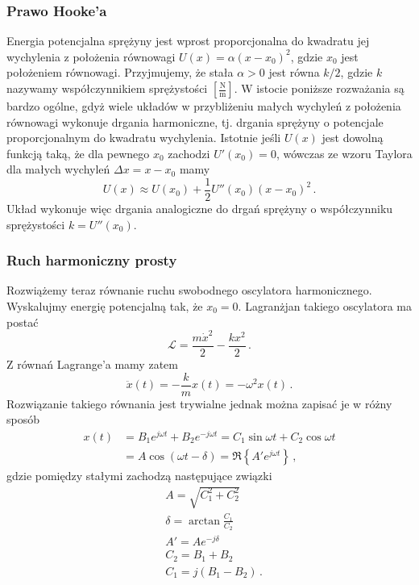 \documentclass[../main.tex]{subfiles}
\begin{document}
    \subsubsection{Prawo Hooke'a}
    Energia potencjalna sprężyny jest wprost proporcjonalna do kwadratu jej wychylenia z położenia
    równowagi \(U(x)=\alpha(x-x_0)^2\), gdzie \(x_0\) jest położeniem równowagi. Przyjmujemy, że
    stała \(\alpha>0\) jest równa \(k/2\), gdzie \(k\) nazywamy współczynnikiem sprężystości
    \([\frac{\text{N}}{\text{m}}]\). W istocie poniższe rozważania są bardzo ogólne, gdyż wiele
    układów w przybliżeniu małych wychyleń z położenia równowagi wykonuje drgania harmoniczne, tj.
    drgania sprężyny o potencjale proporcjonalnym do kwadratu wychylenia. Istotnie jeśli \(U(x)\)
    jest dowolną funkcją taką, że dla pewnego \(x_0\) zachodzi \(U'(x_0)=0\), wówczas ze wzoru
    Taylora dla małych wychyleń \(\Delta x=x-x_0\) mamy 
    \begin{equation*}
        U(x)\approx U(x_0)+\frac{1}{2}U''(x_0)(x-x_0)^2\,.
    \end{equation*}
    Układ wykonuje więc drgania analogiczne do drgań sprężyny o współczynniku sprężystości
    \(k=U''(x_0)\).
    \subsubsection{Ruch harmoniczny prosty}
    Rozwiążemy teraz równanie ruchu swobodnego oscylatora harmonicznego. Wyskalujmy energię
    potencjalną tak, że \(x_0=0\). Lagranżjan takiego oscylatora ma postać
    \begin{equation*}
        \mathcal{L}=\frac{m\dot{x}^2}{2}-\frac{kx^2}{2}\,.
    \end{equation*}
    Z równań Lagrange'a mamy zatem
    \begin{equation*}
        \ddot x(t)=-\frac{k}{m}x(t)=-\omega^2 x(t)\,.
    \end{equation*}
    Rozwiązanie takiego równania jest trywialne jednak można zapisać je w różny sposób
    \begin{equation*}
    \begin{split}
        x(t)&=B_1e^{j\omega t}+B_2e^{-j\omega t}=C_1\sin\omega t+C_2\cos\omega t\\
        &= A\cos(\omega t-\delta)=\Re\left\{A'e^{j\omega t}\right\}\,,
    \end{split}
    \end{equation*}
    gdzie pomiędzy stałymi zachodzą następujące związki
    \begin{equation*}
    \begin{split}
        &A=\sqrt{C_1^2+C_2^2}\\
        &\delta=\arctan\frac{C_1}{C_2}\\
        &A'=Ae^{-j\delta}\\
        &C_2=B_1+B_2\\
        &C_1=j(B_1-B_2)\,.
    \end{split}
    \end{equation*}
    
\end{document}
